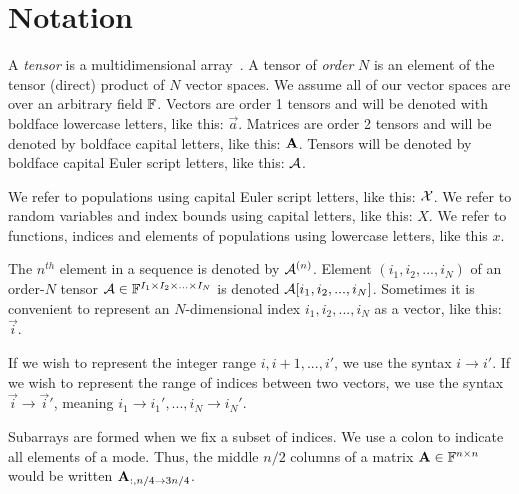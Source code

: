
\section{Notation}
    A \textit{tensor} is a multidimensional array~\cite{KoldBa09}. A tensor of \textit{order} $N$ is an element of the tensor (direct) product of $N$ vector spaces. We assume all of our vector spaces are over an arbitrary field $\mathbb{F}$. Vectors are order 1 tensors and will be denoted with boldface lowercase letters, like this: $\vec{a}$. Matrices are order 2 tensors and will be denoted by boldface capital letters, like this: $\mathbf{A}$. Tensors will be denoted by boldface capital Euler script letters, like this: $\mathbf{\mathcal{A}}$.

    We refer to populations using capital Euler script letters, like this: $\mathcal{X}$. We refer to random variables and index bounds using capital letters, like this: $X$. We refer to functions, indices and elements of populations using lowercase letters, like this $x$.

    The $n^{th}$ element in a sequence is denoted by $\mathbf{\mathcal{A}}^{(n)}$.
    Element $(i_1, i_2, ..., i_N)$ of an order-$N$ tensor $\mathbf{\mathcal{A}} \in \mathbb{F}^{I_1 \times I_2 \times ... \times I_N}$ is denoted $ \mathbf{\mathcal{A}}[i_1, i_2, ..., i_N]$.
    Sometimes it is convenient to represent an $N$-dimensional index $i_1, i_2, ..., i_N$ as a vector, like this: $\vec{i}$.

    If we wish to represent the integer range $i, i + 1, ..., i'$, we use the syntax $i \to i'$. If we wish to represent the range of indices between two vectors, we use the syntax $\vec{i} \to \vec{i}'$, meaning $i_1 \to i_1', ..., i_N \to i_N'$.

    Subarrays are formed when we fix a subset of indices. We use a colon to indicate all elements of a mode. Thus, the middle $n/2$ columns of a matrix $\mathbf{A} \in \mathbb{F}^{n \times n}$ would be written $\mathbf{A}_{:, n/4 \to 3n/4}$.

